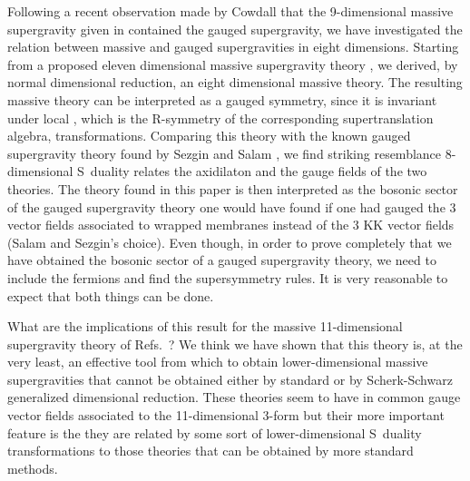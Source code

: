 \documentclass[12pt,a4paper]{article}
\begin{document}
Following a recent observation made by Cowdall \cite{kn:cow} that the
9-dimensional massive supergravity given in \cite{kn:MO} contained the
\coordHE{}  \coordHE{} gauged supergravity, we have investigated the relation
between massive and gauged supergravities in eight dimensions.
Starting from a proposed eleven dimensional massive supergravity
theory \cite{kn:BLO,kn:MO}, we derived, by normal dimensional
reduction, an eight dimensional massive theory. The resulting massive
theory can be interpreted as a gauged symmetry, since it is invariant
under local \coordHE{}, which is the R-symmetry of the corresponding
supertranslation algebra, transformations. Comparing this theory with
the known \coordHE{}  \coordHE{} gauged supergravity theory found by Sezgin and
Salam \cite{kn:SaSe}, we find striking resemblance 8-dimensional
S~duality relates the axidilaton \myHighlight{$\tau$}\coordHE{} and the gauge fields of the
two theories. The theory found in this paper is then interpreted as
the bosonic sector of the gauged supergravity theory one would have
found if one had gauged the 3 vector fields associated to wrapped
membranes instead of the 3 KK vector fields (Salam and Sezgin's
choice).  Even though, in order to prove completely that we have
obtained the bosonic sector of a gauged supergravity theory, we need
to include the fermions and find the supersymmetry rules. It is very
reasonable to expect that both things can be done.


What are the implications of this result for the massive
11-dimensional supergravity theory of Refs.~\cite{kn:BLO,kn:MO}?  We
think we have shown that this theory is, at the very least, an
effective tool from which to obtain lower-dimensional massive
supergravities that cannot be obtained either by standard or by
Scherk-Schwarz generalized dimensional reduction. These theories seem
to have in common gauge vector fields associated to the 11-dimensional
3-form but their more important feature is the they are related by
some sort of lower-dimensional S~duality transformations to those
theories that can be obtained by more standard methods.
\end{document}
